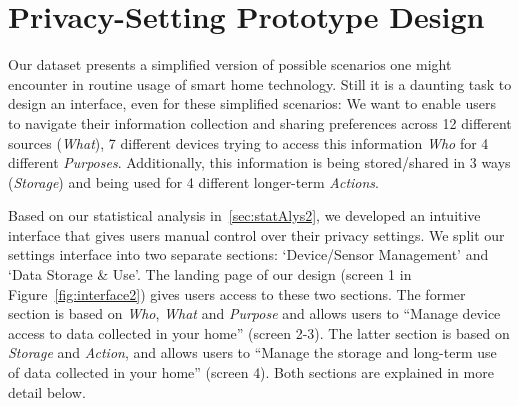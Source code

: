 %
%

\section{Privacy-Setting Prototype Design}\label{sec:design_stat}

Our dataset presents a simplified version of possible scenarios one might encounter in routine usage of smart home technology. Still it is a daunting task to design an interface, even for these simplified scenarios: We want to enable users to navigate their information collection and sharing preferences across 12 different sources (\emph{What}), 7 different devices trying to access this information \emph{Who} for 4 different \emph{Purposes}. Additionally, this information is being stored/shared in 3 ways (\emph{Storage}) and being used for 4 different longer-term \emph{Actions}. 

Based on our statistical analysis in~\ref{sec:statAlys2}, we developed an intuitive interface that gives users manual control over their privacy settings. We split our settings interface into two separate sections: `Device/Sensor Management' and `Data Storage \& Use'. The landing page of our design (screen 1 in Figure~\ref{fig:interface2}) gives users access to these two sections. The former section is based on \emph{Who}, \emph{What} and \emph{Purpose} and allows users to ``Manage device access to data collected in your home'' (screen 2-3). The latter section is based on \emph{Storage} and \emph{Action}, and allows users to ``Manage the storage and long-term use of data collected in your home'' (screen 4). Both sections are explained in more detail below.

